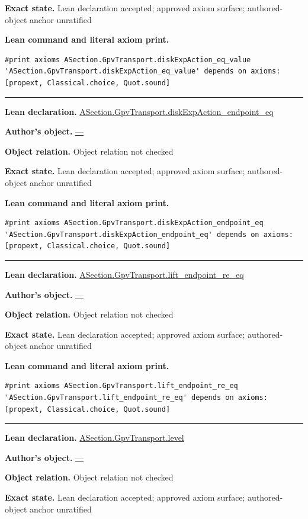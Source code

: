 \documentclass[11pt]{article}
\theoremstyle{plain}
\theoremstyle{definition}
\theoremstyle{remark}
\begin{document}
\begin{tcolorbox}
\par\textbf{Exact state.} Lean declaration accepted; approved axiom surface; authored-object anchor unratified
\par\smallskip\textbf{Lean command and literal axiom print.}
\begin{Verbatim}[breaklines=true,breakanywhere=true,fontsize=\small]
#print axioms ASection.GpvTransport.diskExpAction_eq_value
'ASection.GpvTransport.diskExpAction_eq_value' depends on axioms: [propext, Classical.choice, Quot.sound]
\end{Verbatim}
\medskip\hrule\medskip
\textbf{Lean declaration.} \url{ASection.GpvTransport.diskExpAction_endpoint_eq}
\par\textbf{Author's object.} \url{—}
\par\textbf{Object relation.} Object relation not checked
\par\textbf{Exact state.} Lean declaration accepted; approved axiom surface; authored-object anchor unratified
\par\smallskip\textbf{Lean command and literal axiom print.}
\begin{Verbatim}[breaklines=true,breakanywhere=true,fontsize=\small]
#print axioms ASection.GpvTransport.diskExpAction_endpoint_eq
'ASection.GpvTransport.diskExpAction_endpoint_eq' depends on axioms: [propext, Classical.choice, Quot.sound]
\end{Verbatim}
\medskip\hrule\medskip
\textbf{Lean declaration.} \url{ASection.GpvTransport.lift_endpoint_re_eq}
\par\textbf{Author's object.} \url{—}
\par\textbf{Object relation.} Object relation not checked
\par\textbf{Exact state.} Lean declaration accepted; approved axiom surface; authored-object anchor unratified
\par\smallskip\textbf{Lean command and literal axiom print.}
\begin{Verbatim}[breaklines=true,breakanywhere=true,fontsize=\small]
#print axioms ASection.GpvTransport.lift_endpoint_re_eq
'ASection.GpvTransport.lift_endpoint_re_eq' depends on axioms: [propext, Classical.choice, Quot.sound]
\end{Verbatim}
\medskip\hrule\medskip
\textbf{Lean declaration.} \url{ASection.GpvTransport.level}
\par\textbf{Author's object.} \url{—}
\par\textbf{Object relation.} Object relation not checked
\par\textbf{Exact state.} Lean declaration accepted; approved axiom surface; authored-object anchor unratified

\end{tcolorbox}
\end{document}
